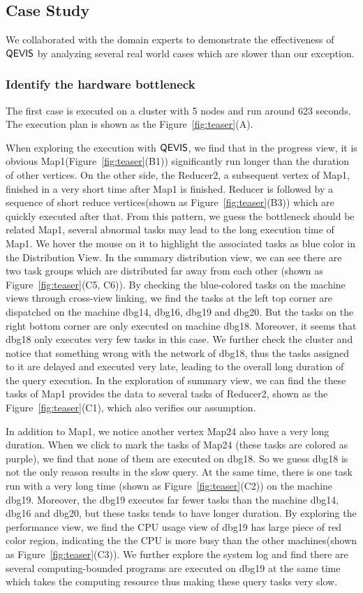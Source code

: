\subsection{Case Study}
We collaborated with the domain experts to demonstrate the effectiveness of $\mathsf{QEVIS}$ by analyzing several real world cases which are slower than our exception.

\subsubsection{Identify the hardware bottleneck}
The first case is executed on a cluster with 5 nodes and run around 623 seconds. The execution plan is shown as the Figure~\ref{fig:teaser}(A).

When exploring the execution with $\mathsf{QEVIS}$, we find that in the progress view, it is obvious Map1(Figure~\ref{fig:teaser}(B1)) significantly run longer than the duration of other vertices. On the other side, the Reducer2, a subsequent vertex of Map1, finished in a very short time after Map1 is finished. Reducer is followed by a sequence of short reduce vertices(shown as Figure~\ref{fig:teaser}(B3)) which are quickly executed after that. 
From this pattern, we guess the bottleneck should be related Map1, several abnormal tasks may lead to the long execution time of Map1. We hover the mouse on it to highlight the associated tasks as blue color in the Distribution View.
In the summary distribution view, we can see there are two task groups which are distributed far away from each other (shown as Figure~\ref{fig:teaser}(C5, C6)). 
By checking the blue-colored tasks on the machine views through cross-view linking, we find the tasks at the left top corner are dispatched on the machine dbg14, dbg16, dbg19 and dbg20. But the tasks on the right bottom corner are only executed on machine dbg18. Moreover, it seems that dbg18 only executes very few tasks in this case. 
We further check the cluster and notice that something wrong with the network of dbg18, thus the tasks assigned to it are delayed and executed very late, leading to the overall long duration of the query execution. In the exploration of summary view, we can find the these tasks of Map1 provides the data to several tasks of Reducer2, shown as the Figure~\ref{fig:teaser}(C1), which also verifies our assumption. 

In addition to Map1, we notice another vertex Map24 also have a very long duration. When we click to mark the tasks of Map24 (these tasks are colored as purple), we find that none of them are executed on dbg18. So we guess dbg18 is not the only reason results in the slow query. At the same time, there is one task run with a very long time (shown as Figure~\ref{fig:teaser}(C2)) on the machine dbg19. Moreover, the dbg19 executes far fewer tasks than the machine dbg14, dbg16 and dbg20, but these tasks tends to have longer duration. By exploring the performance view, we find the CPU usage view of dbg19 has large piece of red color region, indicating the the CPU is more busy than the other machines(shown as Figure~\ref{fig:teaser}(C3)). We further explore the system log and find there are several computing-bounded programs are executed on dbg19 at the same time which takes the computing resource thus making these query tasks very slow.

